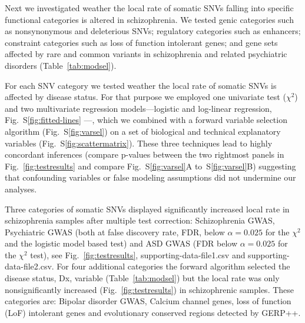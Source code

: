 \documentclass[letterpaper]{article}
\begin{document}
Next we investigated weather the local rate of somatic SNVs falling into
specific functional categories is altered in schizophrenia.  We
tested genic categories such as nonsynonymous and deleterious SNVs;
regulatory categories such as enhancers; constraint
categories such as loss of function intolerant genes; and gene sets affected
by rare and common variants in schizophrenia and related psychiatric
disorders (Table~\ref{tab:modsel}).

For each SNV category we tested weather the local rate of somatic SNVs is
affected by disease status.  For that purpose we employed one univariate test
($\chi^2$) and two multivariate regression models---logistic and log-linear
regression, Fig.~S\ref{fig:fitted-lines} ---, which we combined with a forward
variable selection algorithm (Fig.~S\ref{fig:varsel}) on a set of biological
and technical explanatory variables (Fig.~S\ref{fig:scattermatrix}).  These three techniques
lead to highly concordant inferences (compare p-values between the two
rightmost panels in Fig.~\ref{fig:testresults} and compare
Fig.~S\ref{fig:varsel}A to~S\ref{fig:varsel}B) suggesting that confounding variables or false
modeling assumptions did not undermine our analyses.

Three categories of somatic SNVs displayed significantly increased local rate
in schizophrenia samples after multiple test correction: Schizophrenia GWAS,
Psychiatric GWAS (both at false discovery rate, FDR, below $\alpha=0.025$ for
the $\chi^2$ and the logistic model based test) and ASD GWAS (FDR below
$\alpha=0.025$ for the $\chi^2$ test), see Fig.~\ref{fig:testresults},
supporting-data-file1.csv and supporting-data-file2.csv.  For four additional
categories the forward algorithm selected the disease status, Dx, variable
(Table~\ref{tab:modsel}) but the local rate was only nonsignificantly increased
(Fig.~\ref{fig:testresults}) in schizophrenic samples. These categories are: Bipolar
disorder GWAS, Calcium channel genes, loss of function (LoF) intolerant genes
and evolutionary conserved regions detected by GERP++.
\end{document}
